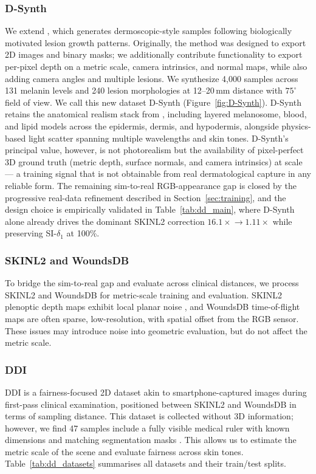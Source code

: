 \documentclass[11pt]{ucthesis}
\begin{document}
\subsubsection{D-Synth}
We extend \cite{kim-2024}, which generates dermoscopic-style samples following biologically motivated lesion growth patterns. Originally, the method was designed to export 2D images and binary masks; we additionally contribute functionality to export per-pixel depth on a metric scale, camera intrinsics, and normal maps, while also adding camera angles and multiple lesions. We synthesize 4{,}000 samples across 131 melanin levels and 240 lesion morphologies at 12--20\,mm distance with $75^\circ$ field of view. We call this new dataset D-Synth (Figure~\ref{fig:D-Synth}). D-Synth retains the anatomical realism stack from \cite{kim-2024}, including layered melanosome, blood, and lipid models across the epidermis, dermis, and hypodermis, alongside physics-based light scatter spanning multiple wavelengths and skin tones. D-Synth's principal value, however, is not photorealism but the availability of pixel-perfect 3D ground truth (metric depth, surface normals, and camera intrinsics) at scale --- a training signal that is not obtainable from real dermatological capture in any reliable form. The remaining sim-to-real RGB-appearance gap is closed by the progressive real-data refinement described in Section~\ref{sec:training}, and the design choice is empirically validated in Table~\ref{tab:dd_main}, where D-Synth alone already drives the dominant SKINL2 correction $16.1\!\times\!\rightarrow\!1.11\!\times$ while preserving SI-$\delta_1$ at 100\%.

\subsubsection{SKINL2 and WoundsDB}\label{sec:realdata}
To bridge the sim-to-real gap and evaluate across clinical distances, we process SKINL2 and WoundsDB for metric-scale training and evaluation. SKINL2 plenoptic depth maps exhibit local planar noise \cite{lourenco-2022}, and WoundsDB time-of-flight maps are often sparse, low-resolution, with spatial offset from the RGB sensor. These issues may introduce noise into geometric evaluation, but do not affect the metric scale.

\subsubsection{DDI}\label{sec:dd_ddi}
DDI \cite{daneshjou_2022_disparities} is a fairness-focused 2D dataset akin to smartphone-captured images during first-pass clinical examination, positioned between SKINL2 and WoundsDB in terms of sampling distance. This dataset is collected without 3D information; however, we find 47 samples include a fully visible medical ruler with known dimensions \cite{delasco} and matching segmentation masks \cite{carrion-2023}. This allows us to estimate the metric scale of the scene and evaluate fairness across skin tones. Table~\ref{tab:dd_datasets} summarises all datasets and their train/test splits.
\end{document}
